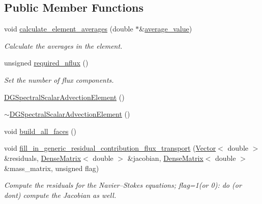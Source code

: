 \subsection*{Public Member Functions}
\begin{DoxyCompactItemize}
\item 
void \hyperlink{classoomph_1_1DGSpectralScalarAdvectionElement_3_012_00_01NNODE__1D_01_4_a7f8e67d242b7a4967cf9bab98486e974}{calculate\+\_\+element\+\_\+averages} (double $\ast$\&\hyperlink{classoomph_1_1DGElement_a9349e3c349f9cf3b25bcb6121e86a7f2}{average\+\_\+value})
\begin{DoxyCompactList}\small\item\em Calculate the averages in the element. \end{DoxyCompactList}\item 
unsigned \hyperlink{classoomph_1_1DGSpectralScalarAdvectionElement_3_012_00_01NNODE__1D_01_4_a7a4facebbe8b314a1364472e66646e55}{required\+\_\+nflux} ()
\begin{DoxyCompactList}\small\item\em Set the number of flux components. \end{DoxyCompactList}\item 
\hyperlink{classoomph_1_1DGSpectralScalarAdvectionElement_3_012_00_01NNODE__1D_01_4_a7ae394d987e10a330769da2bc66089bf}{D\+G\+Spectral\+Scalar\+Advection\+Element} ()
\item 
\hyperlink{classoomph_1_1DGSpectralScalarAdvectionElement_3_012_00_01NNODE__1D_01_4_aba398e8f3377f11b25957e4a86199c40}{$\sim$\+D\+G\+Spectral\+Scalar\+Advection\+Element} ()
\item 
void \hyperlink{classoomph_1_1DGSpectralScalarAdvectionElement_3_012_00_01NNODE__1D_01_4_a90e5d17dfbd134b9f9be110a7ab9085b}{build\+\_\+all\+\_\+faces} ()
\item 
void \hyperlink{classoomph_1_1DGSpectralScalarAdvectionElement_3_012_00_01NNODE__1D_01_4_a9eff513d77d731a1d2492289fd640cb0}{fill\+\_\+in\+\_\+generic\+\_\+residual\+\_\+contribution\+\_\+flux\+\_\+transport} (\hyperlink{classoomph_1_1Vector}{Vector}$<$ double $>$ \&residuals, \hyperlink{classoomph_1_1DenseMatrix}{Dense\+Matrix}$<$ double $>$ \&jacobian, \hyperlink{classoomph_1_1DenseMatrix}{Dense\+Matrix}$<$ double $>$ \&mass\+\_\+matrix, unsigned flag)
\begin{DoxyCompactList}\small\item\em Compute the residuals for the Navier--Stokes equations; flag=1(or 0)\+: do (or don\textquotesingle{}t) compute the Jacobian as well. \end{DoxyCompactList}\end{DoxyCompactItemize}
